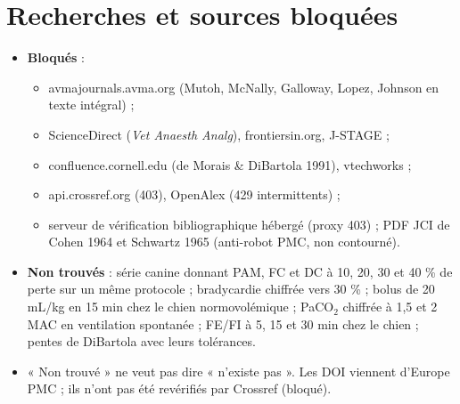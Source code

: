 \documentclass[10pt,a4paper]{article}
\begin{document}
\section{Recherches et sources bloquées}
\begin{itemize}
\item \textbf{Bloqués} :
  \begin{itemize}
  \item avmajournals.avma.org (Mutoh, McNally, Galloway, Lopez, Johnson en texte intégral) ;
  \item ScienceDirect (\emph{Vet Anaesth Analg}), frontiersin.org, J-STAGE ;
  \item confluence.cornell.edu (de Morais \& DiBartola 1991), vtechworks ;
  \item api.crossref.org (403), OpenAlex (429 intermittents) ;
  \item serveur de vérification bibliographique hébergé (proxy 403) ; PDF JCI de Cohen 1964 et Schwartz 1965 (anti-robot PMC, non contourné).
  \end{itemize}
\item \textbf{Non trouvés} : série canine donnant PAM, FC et DC à 10, 20, 30 et 40 \% de perte sur un même protocole ; bradycardie chiffrée vers 30 \% ; bolus de 20 mL/kg en 15 min chez le chien normovolémique ; PaCO$_2$ chiffrée à 1,5 et 2 MAC en ventilation spontanée ; FE/FI à 5, 15 et 30 min chez le chien ; pentes de DiBartola avec leurs tolérances.
\item « Non trouvé » ne veut pas dire « n'existe pas ». Les DOI viennent d'Europe PMC ; ils n'ont pas été revérifiés par Crossref (bloqué).
\end{itemize}
\end{document}
